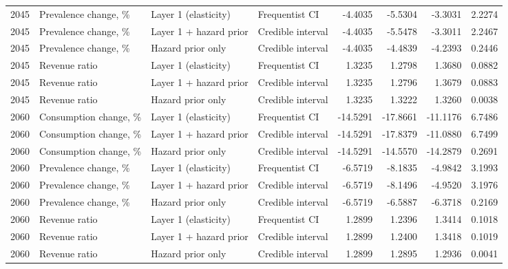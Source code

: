 \begin{longtable}{rlllrrrr}
2045 & Prevalence change, \% & Layer 1 (elasticity) & Frequentist CI & -4.4035 & -5.5304 & -3.3031 & 2.2274 \\
2045 & Prevalence change, \% & Layer 1 + hazard prior & Credible interval & -4.4035 & -5.5478 & -3.3011 & 2.2467 \\
2045 & Prevalence change, \% & Hazard prior only & Credible interval & -4.4035 & -4.4839 & -4.2393 & 0.2446 \\
2045 & Revenue ratio & Layer 1 (elasticity) & Frequentist CI & 1.3235 & 1.2798 & 1.3680 & 0.0882 \\
2045 & Revenue ratio & Layer 1 + hazard prior & Credible interval & 1.3235 & 1.2796 & 1.3679 & 0.0883 \\
2045 & Revenue ratio & Hazard prior only & Credible interval & 1.3235 & 1.3222 & 1.3260 & 0.0038 \\
2060 & Consumption change, \% & Layer 1 (elasticity) & Frequentist CI & -14.5291 & -17.8661 & -11.1176 & 6.7486 \\
2060 & Consumption change, \% & Layer 1 + hazard prior & Credible interval & -14.5291 & -17.8379 & -11.0880 & 6.7499 \\
2060 & Consumption change, \% & Hazard prior only & Credible interval & -14.5291 & -14.5570 & -14.2879 & 0.2691 \\
2060 & Prevalence change, \% & Layer 1 (elasticity) & Frequentist CI & -6.5719 & -8.1835 & -4.9842 & 3.1993 \\
2060 & Prevalence change, \% & Layer 1 + hazard prior & Credible interval & -6.5719 & -8.1496 & -4.9520 & 3.1976 \\
2060 & Prevalence change, \% & Hazard prior only & Credible interval & -6.5719 & -6.5887 & -6.3718 & 0.2169 \\
2060 & Revenue ratio & Layer 1 (elasticity) & Frequentist CI & 1.2899 & 1.2396 & 1.3414 & 0.1018 \\
2060 & Revenue ratio & Layer 1 + hazard prior & Credible interval & 1.2899 & 1.2400 & 1.3418 & 0.1019 \\
2060 & Revenue ratio & Hazard prior only & Credible interval & 1.2899 & 1.2895 & 1.2936 & 0.0041 \\
\end{longtable}
\normalsize
